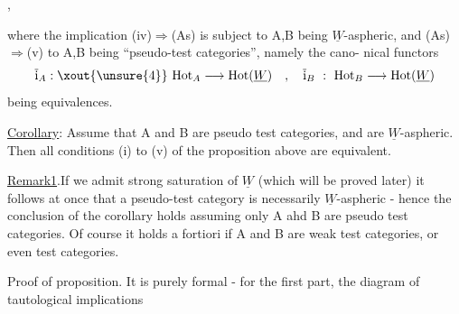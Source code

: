 
\margin{(*)}
 ,

where the implication (iv)$\Rightarrow$(As)   is subject to  A,B  being $\underline{W}$-aspheric,
and  (As)$\Rightarrow$(v) to  A,B  being ``pseudo-test categories'', namely the cano-%
nical functors
\[ \overline{\mathrm{i}}_A : \xout{\unsure{4}}\ \mathrm{Hot}_A \longrightarrow \mathrm{Hot}(\underline{W}) \quad , \quad \overline{\mathrm{i}}_B \ : \ \mathrm{Hot}_B \longrightarrow \mathrm{Hot}(\underline{W}) \]
being equivalences.

\uline{Corollary}:  Assume that A and B are pseudo test categories,  and are
$\underline{W}$-aspheric.  Then  all conditions (i) to (v) of the proposition above are
equivalent.

\uline{Remark1}.If we admit strong saturation of $\underline{W}$  (which will be proved later)\hand{,}
it follows at once that  a pseudo-test category is 
necessarily $\underline{W}$-aspheric  -  hence the conclusion of the corollary holds
assuming only A ahd B are pseudo test categories.  Of course it holds a
fortiori if A and B are weak test categories,  or even test categories.

Proof of proposition.   It is purely formal  -  for the first part,
 the diagram of tautological implications
 \hand{,}

